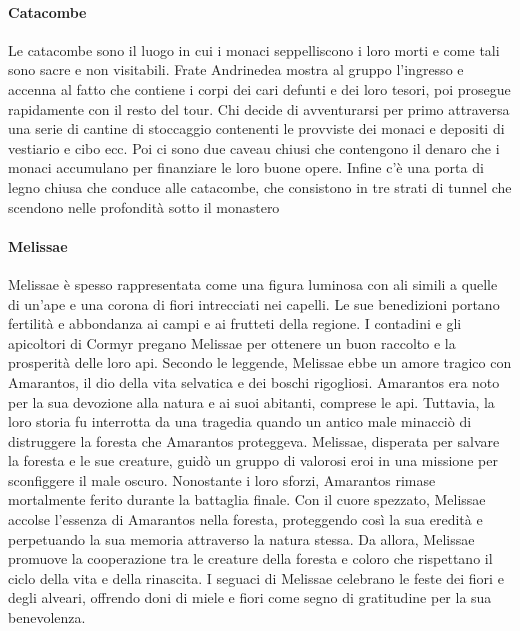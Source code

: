 \documentclass{article}
\begin{document}
    \paragraph{Catacombe}
    Le catacombe sono il luogo in cui i monaci seppelliscono i loro morti e come tali sono sacre e non visitabili. Frate Andrinedea mostra al gruppo l'ingresso e accenna al fatto che contiene i corpi dei cari defunti e dei loro tesori, poi prosegue rapidamente con il resto del tour.
Chi decide di avventurarsi per primo attraversa una serie di cantine di stoccaggio contenenti le provviste dei monaci e depositi di vestiario e cibo ecc.
Poi ci sono due caveau chiusi che contengono il denaro che i monaci accumulano per finanziare le loro buone opere.
Infine c'è una porta di legno chiusa che conduce alle catacombe, che consistono in tre strati di tunnel che scendono nelle profondità sotto il monastero
\paragraph{Melissae}Melissae è spesso rappresentata come una figura luminosa con ali simili a quelle di un'ape e una corona di fiori intrecciati nei capelli. Le sue benedizioni portano fertilità e abbondanza ai campi e ai frutteti della regione. I contadini e gli apicoltori di Cormyr pregano Melissae per ottenere un buon raccolto e la prosperità delle loro api.
Secondo le leggende, Melissae ebbe un amore tragico con Amarantos, il dio della vita selvatica e dei boschi rigogliosi. Amarantos era noto per la sua devozione alla natura e ai suoi abitanti, comprese le api. Tuttavia, la loro storia fu interrotta da una tragedia quando un antico male minacciò di distruggere la foresta che Amarantos proteggeva.
Melissae, disperata per salvare la foresta e le sue creature, guidò un gruppo di valorosi eroi in una missione per sconfiggere il male oscuro. Nonostante i loro sforzi, Amarantos rimase mortalmente ferito durante la battaglia finale. Con il cuore spezzato, Melissae accolse l'essenza di Amarantos nella foresta, proteggendo così la sua eredità e perpetuando la sua memoria attraverso la natura stessa.
Da allora, Melissae promuove la cooperazione tra le creature della foresta e coloro che rispettano il ciclo della vita e della rinascita. I seguaci di Melissae celebrano le feste dei fiori e degli alveari, offrendo doni di miele e fiori come segno di gratitudine per la sua benevolenza.

   
\end{document}
